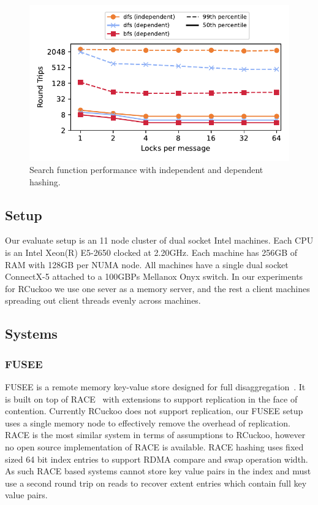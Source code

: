 \begin{figure}[ht]
    \includegraphics[width=0.99\linewidth]{fig/search_dependence.pdf}

    \caption{ Search function performance with independent
    and dependent hashing.}

    \label{fig:search_dependence}
\end{figure}

\subsection{Setup}

Our evaluate setup is an 11 node cluster of dual socket
Intel machines. Each CPU is an Intel Xeon(R) E5-2650 clocked
at 2.20GHz. Each machine has 256GB of RAM with 128GB per
NUMA node. All machines have a single dual socket ConnectX-5
attached to a 100GBPs Mellanox Onyx switch. In our
experiments for RCuckoo we use one sever as a memory server,
and the rest a client machines spreading out client threads
evenly across machines.

\subsection{Systems}

\subsubsection{FUSEE}

FUSEE is a remote memory key-value store designed for full
disaggregation~\cite{fusee}.  It is built on top of
RACE~\cite{race} with extensions to support replication in
the face of contention.  Currently RCuckoo does not support
replication, our FUSEE setup uses a single memory node to
effectively remove the overhead of replication. RACE is the
most similar system in terms of assumptions to RCuckoo,
however no open source implementation of RACE is available.
RACE hashing uses fixed sized 64 bit index entries to
support RDMA compare and swap operation width. As such RACE
based systems cannot store key value pairs in the index and
must use a second round trip on reads to recover extent
entries which contain full key value pairs.

